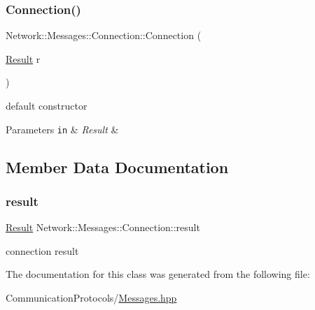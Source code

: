 \subsubsection{\texorpdfstring{Connection()}{Connection()}}
{\footnotesize\ttfamily Network\+::\+Messages\+::\+Connection\+::\+Connection (\begin{DoxyParamCaption}\item[{\hyperlink{class_network_1_1_messages_1_1_connection_a592ae6d90a06c7799df087658848ada6}{Result}}]{r }\end{DoxyParamCaption})\hspace{0.3cm}{\ttfamily [inline]}}



default constructor 


\begin{DoxyParams}[1]{Parameters}
\mbox{\tt in}  & {\em Result} & \\
\hline
\end{DoxyParams}


\subsection{Member Data Documentation}
\mbox{\label{class_network_1_1_messages_1_1_connection_a5ee62fd0bb656b93ef08f22afdc5a47e}} 
\subsubsection{\texorpdfstring{result}{result}}
{\footnotesize\ttfamily \hyperlink{class_network_1_1_messages_1_1_connection_a592ae6d90a06c7799df087658848ada6}{Result} Network\+::\+Messages\+::\+Connection\+::result}

connection result 

The documentation for this class was generated from the following file\+:\begin{DoxyCompactItemize}
\item 
Communication\+Protocols/\hyperlink{_messages_8hpp}{Messages.\+hpp}\end{DoxyCompactItemize}
